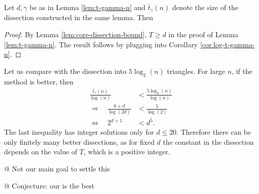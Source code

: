 \begin{lem} Let $d,\gamma$ be as in Lemma \ref{lem:t-gamma-n} and $\bar t_\gamma(n)$ denote the size of the dissection constructed in the same lemma. Then
\end{lem}%
\begin{proof}
By Lemma \ref{lem:core-dissection-bound}, $T \geq d$ in the proof of Lemma \ref{lem:t-gamma-n}. The result follows by plugging into Corollary \ref{cor:log-t-gamma-n}.
\end{proof}

Let us compare with the dissection into $5 \log_2(n)$ triangles. For large $n$, if the method is better, then
\begin{align}
	\frac{\bar t_\gamma(n)}{\log (n)} &< \frac{5 \log_2(n)}{\log(n)} \\
	\Rightarrow \quad \frac{6+d}{\log(2d)} &< \frac{5}{\log(2)} \\
	\Leftrightarrow \quad  2 ^ {d+1} &< d^5.
\end{align}
The last inequality has integer solutions only for $d \leq 20$. Therefore there can be only finitely many better dissections, as for fixed $d$ the constant in the dissection depends on the value of $T$, which is a positive integer.

@ Not our main goal to settle this

@ Conjecture: our is the best



